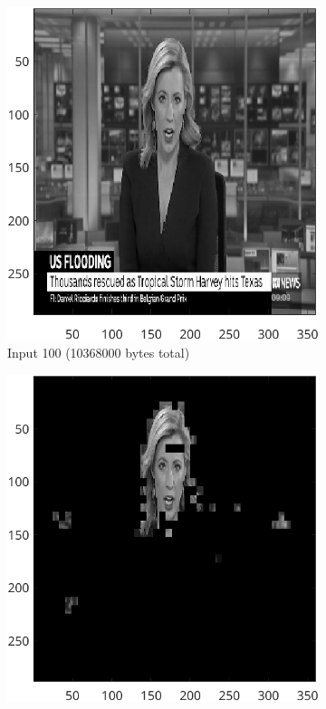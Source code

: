 \documentclass{article}
\begin{document}
		\begin{figure}[ht]
		\centering
			\begin{subfigure}[t]{0.45\textwidth}
			\centering

			\includegraphics[width=\textwidth]{2B_Tolerance5Input}

			\caption{Input 100 (10368000 bytes total)}
			\label{fig:2B_Tolerance5Input}

		\end{subfigure}

			\begin{subfigure}[t]{0.45\textwidth}
			\centering

			\includegraphics[width=\textwidth]{2B_Tolerance5TD}


\end{subfigure}
\end{figure}
\end{document}
